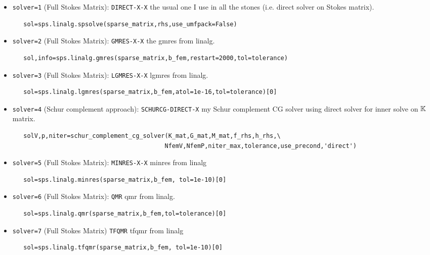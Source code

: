 \begin{itemize}

\item \lstinline{solver=1} (Full Stokes Matrix): {\tt DIRECT-X-X}
the usual one I use in all the stones (i.e. direct solver on Stokes matrix).
\begin{lstlisting}
   sol=sps.linalg.spsolve(sparse_matrix,rhs,use_umfpack=False)
\end{lstlisting}

\item \lstinline{solver=2} (Full Stokes Matrix):  {\tt GMRES-X-X}
the gmres from linalg. 
\begin{lstlisting}
   sol,info=sps.linalg.gmres(sparse_matrix,b_fem,restart=2000,tol=tolerance)
\end{lstlisting}

\item \lstinline{solver=3} (Full Stokes Matrix): {\tt LGMRES-X-X}
 lgmres from linalg.
\begin{lstlisting}
   sol=sps.linalg.lgmres(sparse_matrix,b_fem,atol=1e-16,tol=tolerance)[0]
\end{lstlisting}

\item \lstinline{solver=4} (Schur complement approach): {\tt SCHURCG-DIRECT-X}
my Schur complement CG solver using direct solver for inner solve on ${\mathbb{K}}$ matrix.
\begin{lstlisting}
   solV,p,niter=schur_complement_cg_solver(K_mat,G_mat,M_mat,f_rhs,h_rhs,\
                                          NfemV,NfemP,niter_max,tolerance,use_precond,'direct')
\end{lstlisting}

\item \lstinline{solver=5} (Full Stokes Matrix): {\tt MINRES-X-X} 
minres from linalg
\begin{lstlisting}
   sol=sps.linalg.minres(sparse_matrix,b_fem, tol=1e-10)[0]
\end{lstlisting}

\item \lstinline{solver=6} (Full Stokes Matrix): {\tt QMR}
qmr from linalg.
\begin{lstlisting}
   sol=sps.linalg.qmr(sparse_matrix,b_fem,tol=tolerance)[0]
\end{lstlisting}

\item \lstinline{solver=7}  (Full Stokes Matrix) {\tt TFQMR}
 tfqmr from linalg
\begin{lstlisting}
   sol=sps.linalg.tfqmr(sparse_matrix,b_fem, tol=1e-10)[0]
\end{lstlisting}


\end{itemize}

